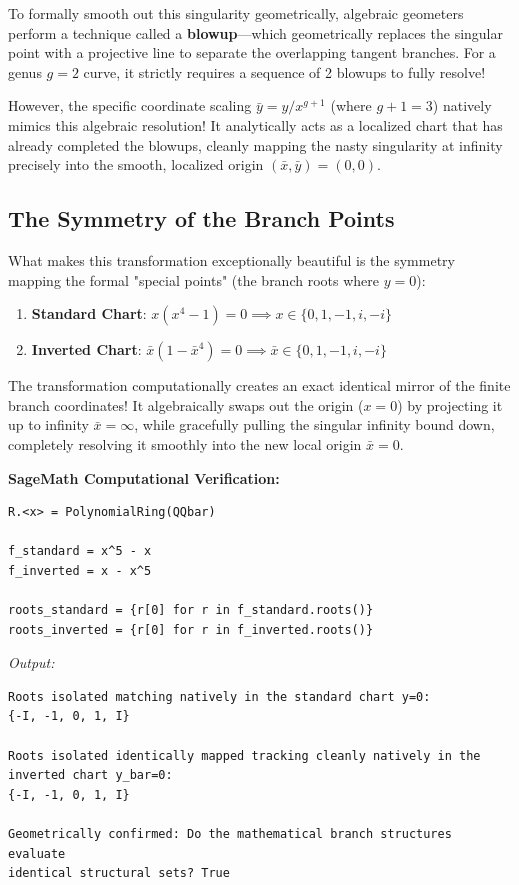\documentclass[12pt,letterpaper]{amsart}
\begin{document}
To formally smooth out this singularity geometrically, algebraic geometers perform a technique called a \textbf{blowup}---which geometrically replaces the singular point with a projective line to separate the overlapping tangent branches. For a genus $g=2$ curve, it strictly requires a sequence of 2 blowups to fully resolve!

However, the specific coordinate scaling $\bar{y} = y/x^{g+1}$ (where $g+1 = 3$) natively mimics this algebraic resolution! It analytically acts as a localized chart that has already completed the blowups, cleanly mapping the nasty singularity at infinity precisely into the smooth, localized origin $(\bar{x}, \bar{y}) = (0,0)$.

\subsection{The Symmetry of the Branch Points}
What makes this transformation exceptionally beautiful is the symmetry mapping the formal "special points" (the branch roots where $y=0$):
\begin{enumerate}
    \item \textbf{Standard Chart}: $x(x^4 - 1) = 0 \implies x \in \{0, 1, -1, i, -i\}$
    \item \textbf{Inverted Chart}: $\bar{x}(1 - \bar{x}^4) = 0 \implies \bar{x} \in \{0, 1, -1, i, -i\}$
\end{enumerate}

The transformation computationally creates an exact identical mirror of the finite branch coordinates! It algebraically swaps out the origin ($x=0$) by projecting it up to infinity $\bar{x}=\infty$, while gracefully pulling the singular infinity bound down, completely resolving it smoothly into the new local origin $\bar{x}=0$.

\vspace{0.5cm}
\noindent\textbf{SageMath Computational Verification:}
\begin{lstlisting}
R.<x> = PolynomialRing(QQbar)

f_standard = x^5 - x
f_inverted = x - x^5

roots_standard = {r[0] for r in f_standard.roots()}
roots_inverted = {r[0] for r in f_inverted.roots()}
\end{lstlisting}
\textit{Output:}
\begin{lstlisting}
Roots isolated matching natively in the standard chart y=0:
{-I, -1, 0, 1, I}

Roots isolated identically mapped tracking cleanly natively in the 
inverted chart y_bar=0:
{-I, -1, 0, 1, I}

Geometrically confirmed: Do the mathematical branch structures evaluate 
identical structural sets? True
\end{lstlisting}
\end{document}
